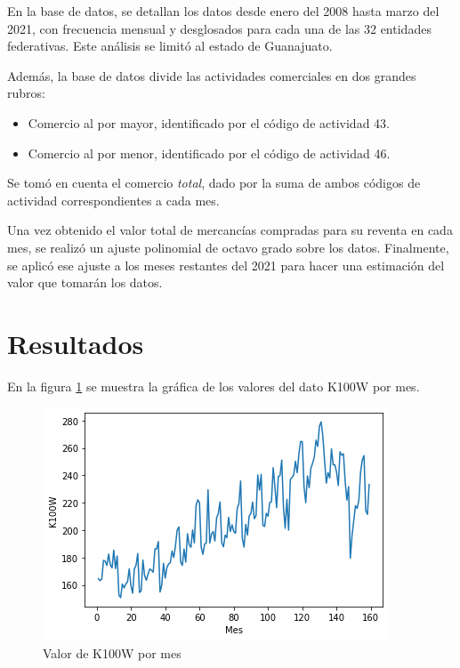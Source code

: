 \documentclass[twocolumn]{article}
\begin{document}
En la base de datos, se detallan los datos desde enero del 2008 hasta marzo del 2021, con frecuencia mensual y desglosados para cada una de las 32 entidades federativas. Este análisis se limitó al estado de Guanajuato.

\medskip

Además, la base de datos divide las actividades comerciales en dos grandes rubros:

\begin{itemize}
    \item Comercio al por mayor, identificado por el código de actividad 43.
    \item Comercio al por menor, identificado por el código de actividad 46.
\end{itemize}

Se tomó en cuenta el comercio \textit{total}, dado por la suma de ambos códigos de actividad correspondientes a cada mes.

\medskip

Una vez obtenido el valor total de mercancías compradas para su reventa en cada mes, se realizó un ajuste polinomial de octavo grado sobre los datos. Finalmente, se aplicó ese ajuste a los meses restantes del 2021 para hacer una estimación del valor que tomarán los datos.

\section{Resultados}

En la figura \ref{fig:1} se muestra la gráfica de los valores del dato K100W por mes.

\medskip

\begin{figure}[h]
\includegraphics[width=\columnwidth]{fig_1}
\caption{Valor de K100W por mes}
\label{fig:1}
\end{figure}
\end{document}
